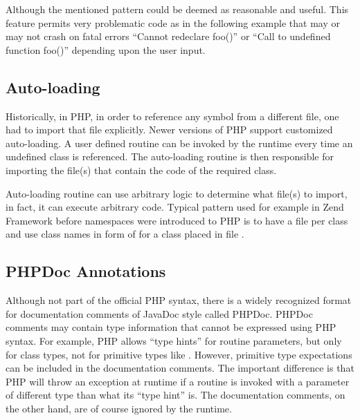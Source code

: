     Although the mentioned pattern could be deemed as 
    reasonable and useful. This feature permits very problematic 
    code as in the following example that may or may not 
    crash on fatal errors ``Cannot redeclare foo()'' or 
    ``Call to undefined function foo()'' depending upon 
    the user input.
    
    
                
    \subsection{Auto-loading}
    Historically, in PHP, in order to reference any symbol 
    from a different file, one had to import that 
    file explicitly. Newer versions of PHP support  
    customized auto-loading. A user defined routine 
    can be invoked by the runtime every time an 
    undefined class is referenced. 
    The auto-loading routine is then responsible for 
    importing the file(s) that contain the code of the 
    required class. 
    
    Auto-loading routine can use arbitrary logic to 
    determine what file(s) to import, in fact, it can 
    execute arbitrary code. Typical 
    pattern used for example in 
    Zend Framework\cite{zendframework} before namespaces were 
    introduced to PHP is to have a file per class and use 
    class names in form of 
     for 
    a class placed in file 
    .
    
    \subsection{PHPDoc Annotations}
    Although not part of the official PHP syntax, 
    there is a widely recognized format for documentation 
    comments of JavaDoc style called PHPDoc. PHPDoc comments 
    may contain type information that cannot be expressed using 
    PHP syntax. For example, PHP allows ``type hints'' 
    for routine parameters, but only for class types, 
    not for primitive types like . However, 
    primitive type expectations can be included in the 
    documentation comments. The important difference 
    is that PHP will throw an exception at runtime if 
    a routine is invoked with a parameter of different 
    type than what its ``type hint'' is. The documentation
    comments, on the other hand, are of course ignored 
    by the runtime.
    
